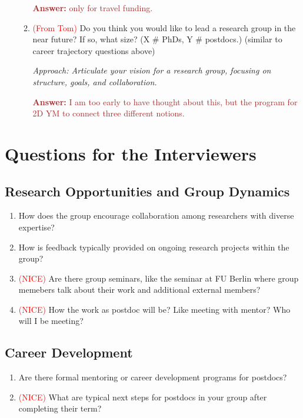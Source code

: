 \documentclass[12pt]{article}
\numberwithin{equation}{section}
\newcommand{\brown}[1]{\textcolor{brown}{#1}}
\newcommand{\red}[1]{\textcolor{red}{#1}}
\begin{document}
\begin{enumerate}
\begin{enumerate}
    \brown{\textbf{Answer:} only for travel funding.}

    \item \red{(From Tom)} Do you think you would like to lead a research group in the near future? If so, what size? (X \# PhDs, Y \# postdocs.) (similar to career trajectory questions above)
    
    \textit{Approach: Articulate your vision for a research group, focusing on structure, goals, and collaboration.}

    \brown{\textbf{Answer:} I am too early to have thought about this, but the program for 2D YM to connect three different notions.}
\end{enumerate}

\end{enumerate}

\section{Questions for the Interviewers}
\subsection{Research Opportunities and Group Dynamics}
\begin{enumerate}
    \item How does the group encourage collaboration among researchers with diverse expertise?


    \item  How is feedback typically provided on ongoing research projects within the group?

    \item \red{(NICE)} Are there group seminars, like the seminar at FU Berlin where group memebers talk about their work and additional external members?

    \item \red{(NICE)} How the work as postdoc will be? Like meeting with mentor? Who will I be meeting? 
\end{enumerate}

\subsection{Career Development}
\begin{enumerate}
    \item Are there formal mentoring or career development programs for postdocs?

    \item \red{(NICE)} What are typical next steps for postdocs in your group after completing their term?
\end{enumerate}
\end{document}
